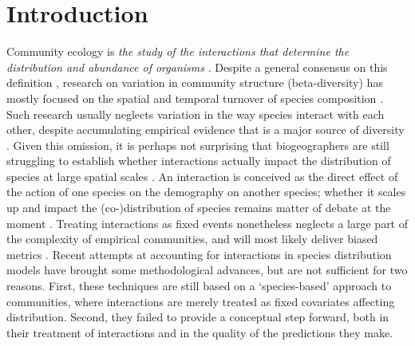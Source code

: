 \documentclass[12pt]{article}
\begin{document}
\newpage

\section*{Introduction}

Community ecology is \textit{the study of the interactions that determine the
distribution and abundance of organisms} \citep{Krebs2001}. Despite a general
consensus on this definition \citep{Scheiner2007a}, research on variation in
community structure (beta-diversity) has mostly focused on the spatial and
temporal turnover of species composition \citep{Anderson2011}. Such research
usually neglects variation in the way species interact with each other,
despite accumulating empirical evidence that is a major source of
diversity \citep{Poisot2015a}. Given this omission, it is perhaps not
surprising that biogeographers are still struggling to establish whether
interactions actually impact the distribution of species at large spatial
scales \citep{Kissling2012}. An interaction is conceived as the direct effect
of the action of one species on the demography on another species; whether it
scales up and impact the (co-)distribution of species remains matter of debate
at the moment \citep{Wisz2012, GonzalezSalazar2013, Cazelles2016b,
Harris2016, Godsoe2017}. Treating interactions as fixed events nonetheless
neglects a large part of the complexity of empirical communities, and will
most likely deliver biased metrics \citep{Poisot2015c}. Recent attempts
at accounting for interactions in species distribution models
\citep{Pollock2014, Pelissier2013, Ovaskainen2017} have brought some
methodological advances, but are not sufficient for two reasons. First, these
techniques are still based on a `species-based' approach to communities, where
interactions are merely treated as fixed covariates affecting distribution.
Second, they failed to provide a conceptual step forward, both in their
treatment of interactions and in the quality of the predictions they make.
\end{document}
